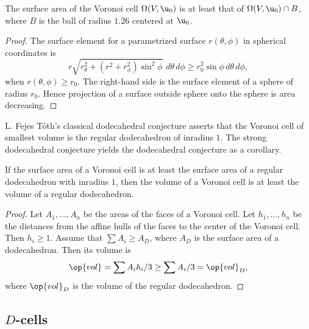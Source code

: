 \begin{lemma}[]
  The surface area of the Voronoi cell $\Omega(V, \u_0)$ is at least
  that of $\Omega(V, \u_0)\cap B$, where $B$ is the ball of radius
  $1.26$ centered at $ \u_0$.
\end{lemma}
%
%

\begin{proof} The surface element for a parametrized surface
  $r(\theta,\phi)$ in spherical coordinates is
\[
%
  r \sqrt{r_\theta^2 + (r^2 + r_\phi^2)\sin^2\phi } \,\,d\theta\,d\phi 
\ge r_0^2 \sin\phi\, d\theta\,d\phi,
\]
when $r(\theta,\phi)\ge r_0$.  The right-hand side is the surface
element of a sphere of radius $r_0$.  Hence projection of a surface
outside sphere onto the sphere is area decreasing.
\end{proof}


L. Fejes T\'oth's classical dodecahedral conjecture asserts that the
Voronoi cell of smallest volume is the regular dodecahedron of
inradius $1$.  %
%
The strong dodecahedral conjecture yields the dodecahedral conjecture
as a corollary.

\begin{lemma}[]
  If the surface area of a Voronoi cell is at least the surface area
  of a regular dodecahedron with inradius $1$, then the volume of a
  Voronoi cell is at least the volume of a regular dodecahedron.
\end{lemma}

\begin{proof} Let $A_1,\ldots,A_n$ be the areas of the faces of a
  Voronoi cell.  Let $h_1,\ldots,h_n$ be the distances from the affine hulls of the faces
  to the center of the Voronoi cell.  Then $h_i\ge 1$.  Assume that
  $\sum A_i \ge A_D$, where $A_D$ is the surface area of a dodecahedron.
  Then its volume is
\[
\op{vol} = \sum A_i h_i/3 \ge \sum A_i/3 = \op{vol}_D,
\]
where $\op{vol}_D$ is the volume of the regular dodecahedron.
\end{proof}
%
%
%


\subsection{$D$-cells}



